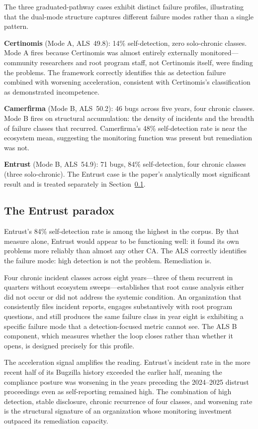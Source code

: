 \documentclass[10pt,twocolumn,letterpaper]{article}
\begin{document}
The three graduated-pathway cases exhibit distinct failure profiles, illustrating that
the dual-mode structure captures different failure modes rather than a single pattern.

\textbf{Certinomis} (Mode A, ALS~49.8): 14\% self-detection, zero solo-chronic classes.
Mode A fires because Certinomis was almost entirely externally monitored---community
researchers and root program staff, not Certinomis itself, were finding the problems.
The framework correctly identifies this as detection failure combined with worsening
acceleration, consistent with Certinomis's classification as demonstrated incompetence.

\textbf{Camerfirma} (Mode B, ALS~50.2): 46 bugs across five years, four chronic classes.
Mode B fires on structural accumulation: the density of incidents and the breadth of
failure classes that recurred. Camerfirma's 48\% self-detection rate is near the
ecosystem mean, suggesting the monitoring function was present but remediation was not.

\textbf{Entrust} (Mode B, ALS~54.9): 71 bugs, 84\% self-detection, four chronic classes
(three solo-chronic). The Entrust case is the paper's analytically most significant
result and is treated separately in Section~\ref{sec:entrust}.

\subsection{The Entrust paradox}
\label{sec:entrust}

Entrust's 84\% self-detection rate is among the highest in the corpus. By that measure
alone, Entrust would appear to be functioning well: it found its own problems more
reliably than almost any other CA. The ALS correctly identifies the failure mode: high
detection is not the problem. Remediation is.

Four chronic incident classes across eight years---three of them recurrent in quarters
without ecosystem sweeps---establishes that root cause analysis either did not occur
or did not address the systemic condition. An organization that consistently files
incident reports, engages substantively with root program questions, and still produces
the same failure class in year eight is exhibiting a specific failure mode that a
detection-focused metric cannot see. The ALS B component, which measures whether the
loop closes rather than whether it opens, is designed precisely for this profile.

The acceleration signal amplifies the reading. Entrust's incident rate in the more
recent half of its Bugzilla history exceeded the earlier half, meaning the compliance
posture was worsening in the years preceding the 2024--2025 distrust proceedings even
as self-reporting remained high. The combination of high detection, stable disclosure,
chronic recurrence of four classes, and worsening rate is the structural signature of
an organization whose monitoring investment outpaced its remediation capacity.
\end{document}
